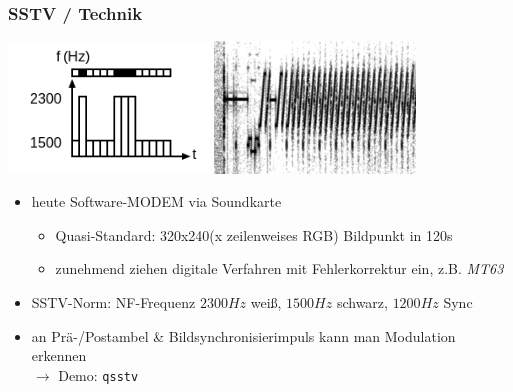 \begin{frame}
    \frametitle{SSTV / Technik}

    \begin{center}
        \includegraphics[width=0.4\textwidth]{e16/Sstv_frequences.png}
        \includegraphics[width=0.4\textwidth]{e16/SSTV_signal.jpg}
        \tiny \hyperlink{refs}{\cite{wc}}
    \end{center}

    \begin{itemize}%
        \item heute Software-MODEM via Soundkarte
        \begin{itemize}
            \item Quasi-Standard: 320x240(x zeilenweises RGB) Bildpunkt in 120s
            \item zunehmend ziehen digitale Verfahren mit Fehlerkorrektur ein,
                  z.B. \emph{MT63}\hyperlink{refs}{\cite{wp}}
        \end{itemize}
        \item SSTV-Norm: NF-Frequenz $2300 Hz$ weiß, $1500 Hz$ schwarz, $1200 Hz$ Sync
        \item an Prä-/Postambel \& Bildsynchronisierimpuls kann man Modulation erkennen \\
              \centering \Large $\rightarrow$ Demo: \texttt{qsstv}
    \end{itemize}

\end{frame}

